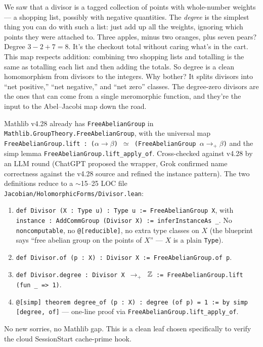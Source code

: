 \begin{layman}
We saw that a divisor is a tagged collection of points with whole-number
weights --- a shopping list, possibly with negative quantities. The
\emph{degree} is the simplest thing you can do with such a list: just add up
all the weights, ignoring which points they were attached to. Three apples,
minus two oranges, plus seven pears? Degree \(3 - 2 + 7 = 8\). It's the
checkout total without caring what's in the cart. This map respects addition:
combining two shopping lists and totalling is the same as totalling each list
and then adding the totals. So degree is a clean homomorphism from divisors
to the integers. Why bother? It splits divisors into ``net positive,''
``net negative,'' and ``net zero'' classes. The degree-zero divisors are the
ones that can come from a single meromorphic function, and they're the input
to the Abel--Jacobi map down the road.
\end{layman}

\begin{proofsketch}
Mathlib v4.28 already has \texttt{FreeAbelianGroup} in
\texttt{Mathlib.GroupTheory.FreeAbelianGroup}, with the universal map
\texttt{FreeAbelianGroup.lift : ($\alpha\to\beta$) $\simeq$
(FreeAbelianGroup $\alpha\to_+\beta$)} and the simp lemma
\texttt{FreeAbelianGroup.lift\_apply\_of}. Cross-checked against v4.28 by
an LLM round (ChatGPT proposed the wrapper, Grok confirmed name
correctness against the v4.28 source and refined the instance pattern).
The two definitions reduce to a $\sim$15--25 LOC file
\texttt{Jacobian/HolomorphicForms/Divisor.lean}:
\begin{enumerate}
\item \texttt{def Divisor (X : Type u) : Type u := FreeAbelianGroup X},
  with \texttt{instance : AddCommGroup (Divisor X) := inferInstanceAs \_}.
  No \texttt{noncomputable}, no \texttt{@[reducible]}, no extra type
  classes on \(X\) (the blueprint says ``free abelian group on the
  points of \(X\)'' --- \(X\) is a plain \texttt{Type}).
\item \texttt{def Divisor.of (p : X) : Divisor X := FreeAbelianGroup.of p}.
\item \texttt{def Divisor.degree : Divisor X $\to_+$ $\mathbb{Z}$ :=
  FreeAbelianGroup.lift (fun \_ => 1)}.
\item \texttt{@[simp] theorem degree\_of (p : X) :
  degree (of p) = 1 := by simp [degree, of]} ---
  one-line proof via \texttt{FreeAbelianGroup.lift\_apply\_of}.
\end{enumerate}
No new sorries, no Mathlib gap. This is a clean leaf chosen specifically
to verify the cloud SessionStart cache-prime hook.
\end{proofsketch}

